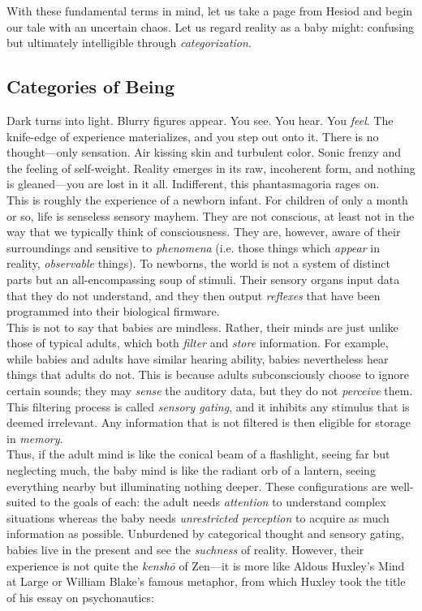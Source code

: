 With these fundamental terms in mind, let us take a page from Hesiod and begin our tale with an uncertain chaos. Let us regard reality as a baby might: confusing but ultimately intelligible through \textit{categorization}. \\

\subsection{Categories of Being}

Dark turns into light. Blurry figures appear. You see. You hear. You \textit{feel}. The knife-edge of experience materializes, and you step out onto it. There is no thought---only sensation. Air kissing skin and turbulent color. Sonic frenzy and the feeling of self-weight. Reality emerges in its raw, incoherent form, and nothing is gleaned---you are lost in it all. Indifferent, this phantasmagoria rages on. \\

This is roughly the experience of a newborn infant. For children of only a month or so, life is senseless sensory mayhem. They are not conscious, at least not in the way that we typically think of consciousness. They are, however, aware of their surroundings and sensitive to \textit{phenomena} (i.e. those things which \textit{appear} in reality, \textit{observable} things). To newborns, the world is not a system of distinct parts but an all-encompassing soup of stimuli. Their sensory organs input data that they do not understand, and they then output \textit{reflexes} that have been programmed into their biological firmware. \\

This is not to say that babies are mindless. Rather, their minds are just unlike those of typical adults, which both \textit{filter} and \textit{store} information. For example, while babies and adults have similar hearing ability, babies nevertheless hear things that adults do not. This is because adults subconsciously choose to ignore certain sounds; they may \textit{sense} the auditory data, but they do not \textit{perceive} them. This filtering process is called \textit{sensory gating}, and it inhibits any stimulus that is deemed irrelevant. Any information that is not filtered is then eligible for storage in \textit{memory}. \\

Thus, if the adult mind is like the conical beam of a flashlight, seeing far but neglecting much, the baby mind is like the radiant orb of a lantern, seeing everything nearby but illuminating nothing deeper. These configurations are well-suited to the goals of each: the adult needs \textit{attention} to understand complex situations whereas the baby needs \textit{unrestricted perception} to acquire as much information as possible. Unburdened by categorical thought and sensory gating, babies live in the present and see the \textit{suchness} of reality. However, their experience is not quite the \textit{kensh\=o} of Zen---it is more like Aldous Huxley's Mind at Large or William Blake's famous metaphor, from which Huxley took the title of his essay on psychonautics: \\

